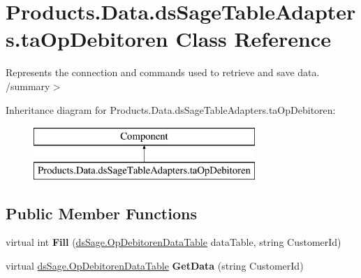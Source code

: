\hypertarget{class_products_1_1_data_1_1ds_sage_table_adapters_1_1ta_op_debitoren}{}\section{Products.\+Data.\+ds\+Sage\+Table\+Adapters.\+ta\+Op\+Debitoren Class Reference}
\label{class_products_1_1_data_1_1ds_sage_table_adapters_1_1ta_op_debitoren}


Represents the connection and commands used to retrieve and save data. /summary$>$  


Inheritance diagram for Products.\+Data.\+ds\+Sage\+Table\+Adapters.\+ta\+Op\+Debitoren\+:\begin{figure}[H]
\begin{center}
\leavevmode
\includegraphics[height=2.000000cm]{class_products_1_1_data_1_1ds_sage_table_adapters_1_1ta_op_debitoren}
\end{center}
\end{figure}
\subsection*{Public Member Functions}
\begin{DoxyCompactItemize}
\item 
virtual int {\bfseries Fill} (\hyperlink{class_products_1_1_data_1_1ds_sage_1_1_op_debitoren_data_table}{ds\+Sage.\+Op\+Debitoren\+Data\+Table} data\+Table, string Customer\+Id)\hypertarget{class_products_1_1_data_1_1ds_sage_table_adapters_1_1ta_op_debitoren_a498a72e10a855bee95012aa0c838c452}{}\label{class_products_1_1_data_1_1ds_sage_table_adapters_1_1ta_op_debitoren_a498a72e10a855bee95012aa0c838c452}

\item 
virtual \hyperlink{class_products_1_1_data_1_1ds_sage_1_1_op_debitoren_data_table}{ds\+Sage.\+Op\+Debitoren\+Data\+Table} {\bfseries Get\+Data} (string Customer\+Id)\hypertarget{class_products_1_1_data_1_1ds_sage_table_adapters_1_1ta_op_debitoren_a4d605cfd1a65a7441b732e4bd11aaa75}{}\label{class_products_1_1_data_1_1ds_sage_table_adapters_1_1ta_op_debitoren_a4d605cfd1a65a7441b732e4bd11aaa75}

\end{DoxyCompactItemize}
